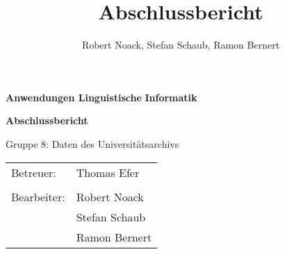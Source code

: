 \documentclass[12pt,a4paper]{article}
\title{Abschlussbericht}
\author{Robert Noack, Stefan Schaub, Ramon Bernert}
\begin{document}
\thispagestyle{empty}

\vspace*{2cm}
\begin{LARGE}

\hspace*{1.2cm}\textbf{Anwendungen Linguistische}
\newline
\hspace*{4.5cm}\textbf{Informatik}

\vspace*{0.8cm}
\hspace*{2.8cm}\textbf{Abschlussbericht}

\vspace*{1cm}
Gruppe 8: Daten des Universitätsarchivs
\end{LARGE}

\vspace*{\fill}
\begin{large}
 \begin{tabular}{p{7cm} l}
  Betreuer:		& Thomas Efer	\\
\\
  Bearbeiter: 	& Robert Noack 	\\
				& Stefan Schaub \\
				& Ramon Bernert \\
 \end{tabular}
\end{large}


\newpage
\thispagestyle{empty}

\tableofcontents
{}


\newpage
\setcounter{page}{1}







\newpage
\end{document}
